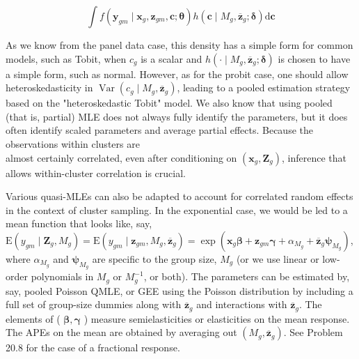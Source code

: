 \documentclass[10pt]{article}
\begin{document}
\begin{equation*}
\int f\left(\mathbf{y}_{g m} \mid \mathbf{x}_{g}, \mathbf{z}_{g m}, \mathbf{c} ; \boldsymbol{\theta}\right) h\left(\mathbf{c} \mid M_{g}, \overline{\mathbf{z}}_{g} ; \boldsymbol{\delta}\right) \mathrm{d} \mathbf{c} \tag{20.49}
\end{equation*}


As we know from the panel data case, this density has a simple form for common models, such as Tobit, when $c_{g}$ is a scalar and $h\left(\cdot \mid M_{g}, \overline{\mathbf{z}}_{g} ; \boldsymbol{\delta}\right)$ is chosen to have a simple form, such as normal. However, as for the probit case, one should allow heteroskedasticity in $\operatorname{Var}\left(c_{g} \mid M_{g}, \overline{\mathbf{z}}_{g}\right)$, leading to a pooled estimation strategy based on the "heteroskedastic Tobit" model. We also know that using pooled (that is, partial) MLE does not always fully identify the parameters, but it does often identify scaled parameters and average partial effects. Because the observations within clusters are\\
almost certainly correlated, even after conditioning on $\left(\mathbf{x}_{g}, \mathbf{Z}_{g}\right)$, inference that allows within-cluster correlation is crucial.

Various quasi-MLEs can also be adapted to account for correlated random effects in the context of cluster sampling. In the exponential case, we would be led to a mean function that looks like, say,\\
$\mathrm{E}\left(y_{g m} \mid \mathbf{Z}_{g}, M_{g}\right)=\mathrm{E}\left(y_{g m} \mid \mathbf{z}_{g m}, M_{g}, \overline{\mathbf{z}}_{g}\right)=\exp \left(\mathbf{x}_{g} \boldsymbol{\beta}+\mathbf{z}_{g m} \boldsymbol{\gamma}+\alpha_{M_{g}}+\overline{\mathbf{z}}_{g} \boldsymbol{\psi}_{M_{g}}\right)$,\\
where $\alpha_{M_{g}}$ and $\boldsymbol{\psi}_{M_{g}}$ are specific to the group size, $M_{g}$ (or we use linear or low-order polynomials in $M_{g}$ or $M_{g}^{-1}$, or both). The parameters can be estimated by, say, pooled Poisson QMLE, or GEE using the Poisson distribution by including a full set of group-size dummies along with $\overline{\mathbf{z}}_{g}$ and interactions with $\overline{\mathbf{z}}_{g}$. The elements of ( $\boldsymbol{\beta}, \boldsymbol{\gamma}$ ) measure semielasticities or elasticities on the mean response. The APEs on the mean are obtained by averaging out $\left(M_{g}, \overline{\mathbf{z}}_{g}\right)$. See Problem 20.8 for the case of a fractional response.
\end{document}
